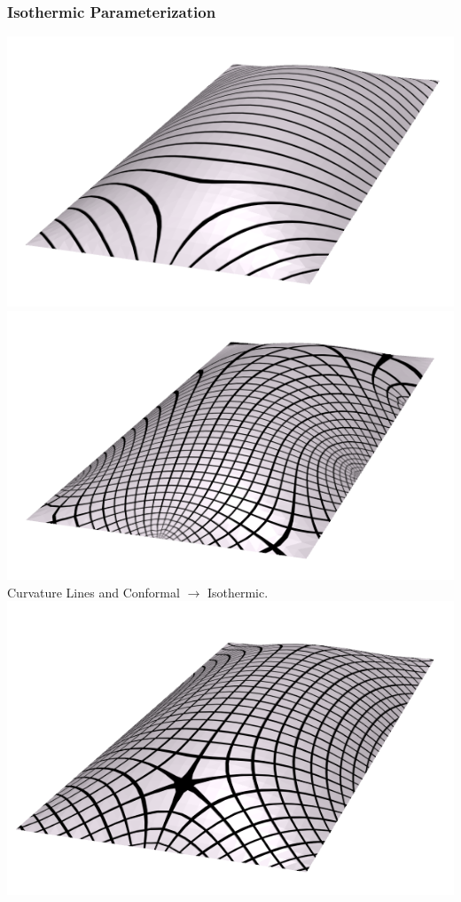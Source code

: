 \documentclass[12pt]{beamer}
\begin{document}
\begin{frame}
	\frametitle{Isothermic Parameterization}
	\begin{center}
		\includegraphics[width=0.45\linewidth]{roof_curvature_lines2.png}
		\includegraphics[width=0.45\linewidth]{roof_conformal.png}\\
		Curvature Lines and Conformal $\rightarrow$ Isothermic.\\
		\includegraphics[width=0.6\linewidth]{roof_isothermic.png}
	\end{center}
\end{frame}
\end{document}
